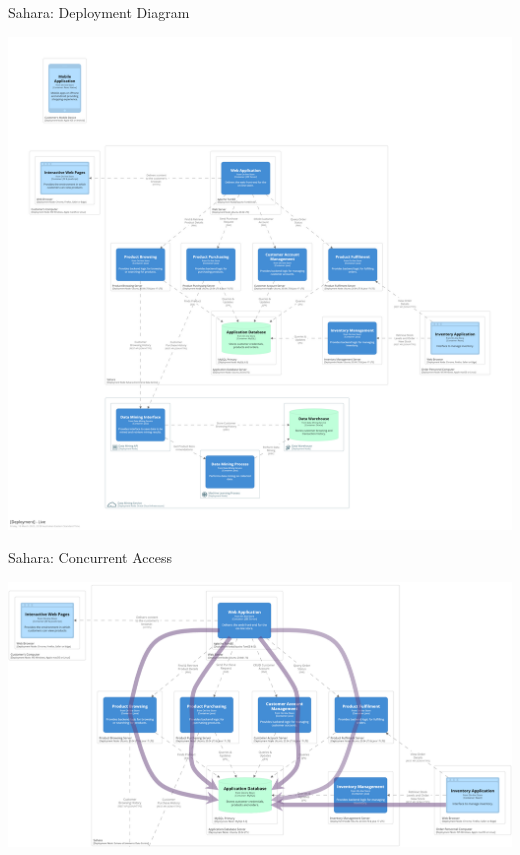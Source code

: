 \documentclass{slide}
\begin{document}
\begin{frame}{Sahara: Deployment Diagram}
    \begin{adjustwidth}{-5mm}{-5mm}
        \centering
        \includegraphics[trim=197 1340 197 1002,clip,width=0.935\paperwidth]{diagrams/sahara-deployment.png}
    \end{adjustwidth}
\end{frame}

\begin{frame}{Sahara: Concurrent Access}
    \begin{adjustwidth}{-5mm}{-5mm}
        \centering
        \includegraphics[trim=1 0 1 5,clip,width=0.935\paperwidth]{diagrams/sahara-concurrency.png}
    \end{adjustwidth}
\end{frame}
\end{document}
